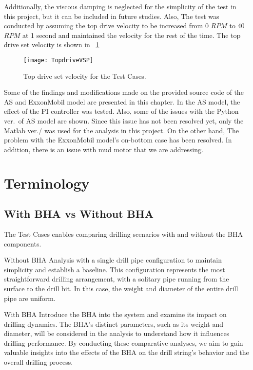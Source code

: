 Additionally, the viscous damping is neglected for the simplicity of the test in this project, but it can be included in future studies. Also, The test was conducted by assuming the top drive velocity to be increased from 0 $RPM$ to 40 $RPM$ at 1 second and maintained the velocity for the rest of the time. The top drive set velocity is shown in \figurename~\ref{figure_topdrive_VSP}
\begin{figure}[!hbt]
  \centering
  \texttt{[image: TopdriveVSP]}
  \caption[Top drive set velocity for the Test Cases]{Top drive set velocity for the Test Cases.}\label{figure_topdrive_VSP}
\end{figure}

Some of the findings and modifications made on the provided source code of the AS and ExxonMobil model are presented in this chapter. In the AS model, the effect of the PI controller was tested. Also, some of the issues with the Python ver.\ of AS model are shown. Since this issue has not been resolved yet, only the Matlab ver./ was used for the analysis in this project. On the other hand, The problem with the ExxonMobil model's on-bottom case has been resolved. In addition, there is an issue with mud motor that we are addressing. 
\section{Terminology}
\subsection{With BHA vs Without BHA}

The Test Cases enables comparing drilling scenarios with and without the BHA components. 

\begin{definition}{Without BHA}
Analysis with a single drill pipe configuration to maintain simplicity and establish a baseline. This configuration represents the most straightforward drilling arrangement, with a solitary pipe running from the surface to the drill bit. In this case, the weight and diameter of the entire drill pipe are uniform.
\end{definition}
\begin{definition}{With BHA}
Introduce the BHA into the system and examine its impact on drilling dynamics. The BHA's distinct parameters, such as its weight and diameter, will be considered in the analysis to understand how it influences drilling performance. By conducting these comparative analyses, we aim to gain valuable insights into the effects of the BHA on the drill string's behavior and the overall drilling process.
\end{definition}

